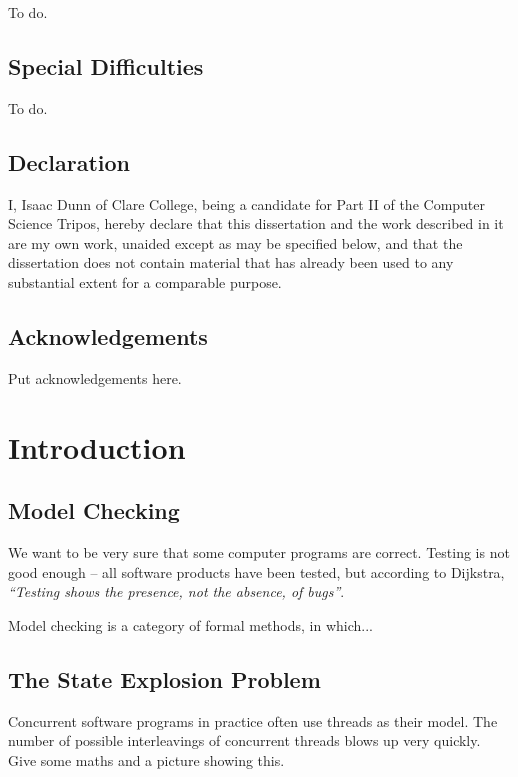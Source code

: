 \documentclass[12pt,a4paper,twoside,openright]{report}
\begin{document}
To do.

\section*{Special Difficulties}

To do.
 
\newpage
\section*{Declaration}

I, Isaac Dunn of Clare College, being a candidate for Part II of the Computer
Science Tripos, hereby declare
that this dissertation and the work described in it are my own work,
unaided except as may be specified below, and that the dissertation
does not contain material that has already been used to any substantial
extent for a comparable purpose.

\bigskip
{}

\bigskip
{}

\tableofcontents

\listoffigures

\newpage
\section*{Acknowledgements}

Put acknowledgements here.


\pagestyle{headings}

\chapter{Introduction}

\section{Model Checking}
We want to be very sure that some computer
programs are correct. Testing is not good
enough -- all software products have been
tested, but according to Dijkstra,
\emph{``Testing shows the presence,
	not the absence, of bugs''}.

Model checking is a category of formal
methods, in which...

\section{The State Explosion Problem}
Concurrent software programs in practice often
use threads as their model. The number of possible
interleavings of concurrent threads blows up very 
quickly. Give some maths and a picture showing this.
\end{document}

